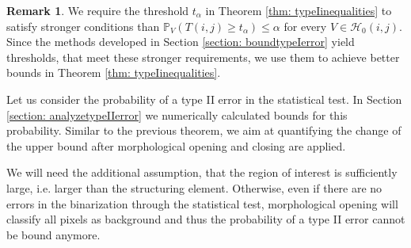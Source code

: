 \documentclass[a4paper,12pt]{article}
\theoremstyle{plain}
\theoremstyle{definition}
\newtheorem{remark}[theorem]{Remark}
\begin{document}
\begin{remark}
	We require the threshold $t_\alpha$ in Theorem \ref{thm: typeIinequalities} to satisfy stronger conditions than $\mathbb{P}_V( T(i, j) \geq t_\alpha ) \leq \alpha$ for every $V \in \mathcal{H}_0(i, j)$. Since the methods developed in Section \ref{section: boundtypeIerror} yield thresholds, that meet these stronger requirements, we use them to achieve better bounds in Theorem \ref{thm: typeIinequalities}.
\end{remark}

Let us consider the probability of a type II error in the statistical test. In Section \ref{section: analyzetypeIIerror} we numerically calculated bounds for this probability. Similar to the previous theorem, we aim at quantifying the change of the upper bound after morphological opening and closing are applied.

We will need the additional assumption, that the region of interest is sufficiently large, i.e. larger than the structuring element. Otherwise, even if there are no errors in the binarization through the statistical test, morphological opening will classify all pixels as background and thus the probability of a type II error cannot be bound anymore.
\end{document}

